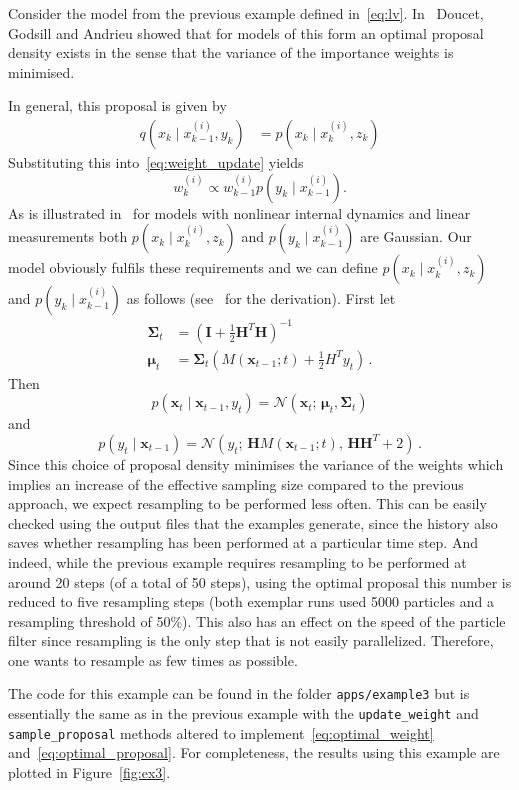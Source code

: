 \begin{example}\label{ex:lv2}
  Consider the model from the previous example defined
  in~\eqref{eq:lv}. In~\cite{Doucet2000} Doucet, Godsill and Andrieu
  showed that for models of this form an optimal proposal density
  exists in the sense that the variance of the importance weights is
  minimised.

  In general, this proposal is given by
  \begin{align*}
    q(x_k \mid x^{(i)}_{k-1}, y_k) &= p(x_k \mid x_k^{(i)}, z_k)
  \end{align*}
  Substituting this into~\eqref{eq:weight_update} yields
  \[
    w_k^{(i)} \propto w_{k-1}^{(i)} p(y_k \mid x_{k-1}^{(i)}).
  \]
  As is illustrated in~\cite[Example 3]{Doucet2000} for models with
  nonlinear internal dynamics and linear measurements both
  $p(x_k \mid x_k^{(i)}, z_k)$ and $p(y_k \mid x_{k-1}^{(i)})$ are
  Gaussian. Our model obviously fulfils these requirements and we can
  define $p(x_k \mid x_k^{(i)}, z_k)$ and $p(y_k \mid x_{k-1}^{(i)})$
  as follows (see~\cite{Doucet2000} for the derivation). First let
  \begin{align*}
    \bm{\Sigma}_t &= {\left(\bm{I} + \frac{1}{2} \bm{H}^T \bm{H}\right)}^{-1}\,\\
    \bm{\mu}_t &= \bm{\Sigma}_t \left(M(\bm{x}_{t-1}; t) + \frac{1}{2} H^T y_t\right)\,.
  \end{align*}
  Then
  \begin{equation}
    \label{eq:optimal_proposal}
    p(\bm{x}_t \mid \bm{x}_{t-1}, y_t) = \mathcal{N}(\bm{x}_t;\, \bm{\mu}_t, \bm{\Sigma}_t)
  \end{equation}
  and
  \begin{equation}
    \label{eq:optimal_weight}
    p(y_t \mid \bm{x}_{t-1}) = \mathcal{N}(y_t; \, \bm{H} M(\bm{x}_{t-1}; t), \,  \bm{H} \bm{H}^T + 2)\,.
  \end{equation}
  Since this choice of proposal density minimises the variance of the
  weights which implies an increase of the effective sampling size
  compared to the previous approach, we expect resampling to be
  performed less often. This can be easily checked using the output
  files that the examples generate, since the history also saves
  whether resampling has been performed at a particular time step. And
  indeed, while the previous example requires resampling to be
  performed at around 20 steps (of a total of 50 steps), using the
  optimal proposal this number is reduced to five resampling steps
  (both exemplar runs used 5000 particles and a resampling threshold
  of 50\%). This also has an effect on the speed of the particle
  filter since resampling is the only step that is not easily
  parallelized. Therefore, one wants to resample as few times as
  possible.

  The code for this example can be found in the folder
  \texttt{apps/example3} but is essentially the same as in the
  previous example with the \texttt{update\_weight} and
  \texttt{sample\_proposal} methods altered to
  implement~\eqref{eq:optimal_weight} and~\eqref{eq:optimal_proposal}.
  For completeness, the results using this example are plotted in
  Figure~\ref{fig:ex3}.
\end{example}

